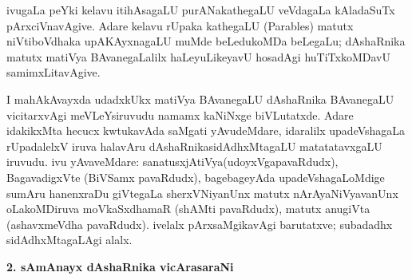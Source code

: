 ivugaLa peYki kelavu itihAsagaLU purANakathegaLU veVdagaLa kAladaSuTx pArxciVnavAgive. Adare kelavu rUpaka kathegaLU {\rm(Parables)} matutx niVtiboVdhaka upAKAyxnagaLU muMde beLedukoMDa beLegaLu; dAshaRnika matutx matiVya BAvanegaLalilx haLeyuLikeyavU hosadAgi huTiTxkoMDavU samimxLitavAgive.

I mahAkAvayxda udadxkUkx matiVya BAvanegaLU dAshaRnika BAvanegaLU vicitarx\-vAgi meVLeYsiruvudu namamx kaNiNxge biVLutatxde. Adare idakikxMta hecucx kwtukavAda \hbox{saMgati} yAvudeMdare, idaralilx upadeVshagaLa rUpadalelxV iruva halavAru dAshaRnika\break sidAdhxMtagaLU matatatavxgaLU iruvudu. ivu yAvaveMdare: sanatusxjAtiVya\break (udoyxVgapavaRdudx), BagavadigxVte (BiVSamx pavaRdudx), bagebageyAda upadeVsha\-gaLoMdige sumAru hanenxraDu giVtegaLa sherxVNiyanUnx matutx nArAyaNiVyavanUnx oLakoMDiruva moVkaSxdhamaR (shAMti pavaRdudx), matutx anugiVta (ashavxmeVdha pavaRdudx). ivelalx pArxsaMgikavAgi barutatxve; subadadhx sidAdhxMtagaLAgi alalx.

\bigskip
\begin{center}
{\Large\bf 2. sAmAnayx dAshaRnika vicArasaraNi}
\end{center}

